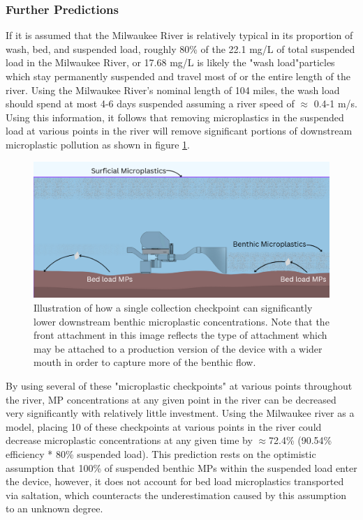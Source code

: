\documentclass[fleqn,10pt]{SelfArx} %
\begin{document}
	\subsubsection{Further Predictions}	
	If it is assumed that the Milwaukee River is relatively typical in its proportion of wash, bed, and suspended load, roughly 80\% of the 22.1 mg/L of total suspended load in the Milwaukee River, or 17.68 mg/L is likely the "wash load"\textemdash particles which stay permanently suspended and travel most of or the entire length of the river. Using the Milwaukee River's nominal length of 104 miles, the wash load should spend at most 4-6 days suspended assuming a river speed of $\approx$ 0.4-1 m/s. 
	\linebreak
	Using this information, it follows that removing microplastics in the suspended load at various points in the river will remove significant portions of downstream microplastic pollution as shown in figure \ref{fig:washload}.
	\begin{figure}[h]
		\centering
		\includegraphics[width=1\linewidth]{Figures/WashLoadCollection}
		\caption[Wash Load MP Collection]{Illustration of how a single collection checkpoint can significantly lower downstream \gls{benthic} microplastic concentrations. Note that the front attachment in this image reflects the type of attachment which may be attached to a production version of the device with a wider mouth in order to capture more of the \gls{benthic} flow.}
		\label{fig:washload}
	\end{figure}
	By using several of these "microplastic checkpoints" at various points throughout the river, MP concentrations at any given point in the river can be decreased very significantly with relatively little investment. Using the Milwaukee river as a model, placing 10 of these checkpoints at various points in the river could decrease microplastic concentrations at any given time by $\approx$72.4\% (90.54\% efficiency * 80\% suspended load). This prediction rests on the optimistic assumption that 100\% of suspended \gls{benthic} MPs within the suspended load enter the device, however, it does not account for bed load microplastics transported via \gls{saltation}, which counteracts the underestimation caused by this assumption to an unknown degree.
	
\end{document}
